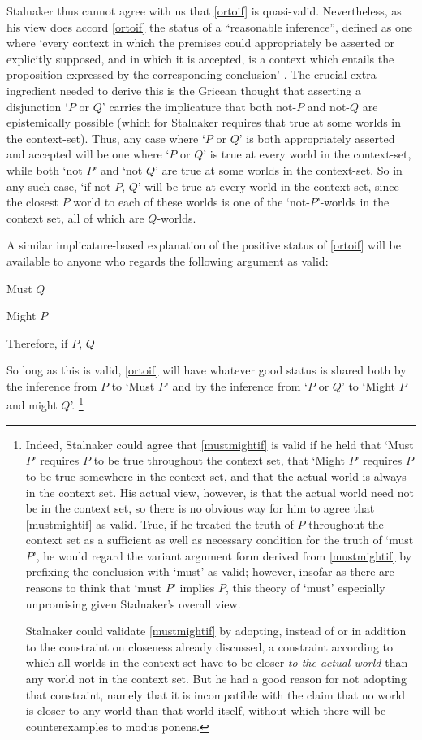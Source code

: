 \documentclass[If.tex]{subfiles}
\begin{document}
Stalnaker thus cannot agree with us that \ref{ortoif} is quasi-valid.  Nevertheless, as his view does accord \ref{ortoif} the status of a “reasonable inference”, defined as one where ‘every context in which the premises could appropriately be asserted or explicitly supposed, and in which it is accepted, is a context which entails the proposition expressed by the corresponding conclusion’ \parencite{StalnakerIC}.  The crucial extra ingredient needed to derive this is the Gricean thought that asserting a disjunction ‘$P$ or $Q$’ carries the implicature that both not-$P$ and not-$Q$ are epistemically possible (which for Stalnaker requires that true at some worlds in the context-set).  Thus, any case where ‘$P$ or $Q$’ is both appropriately asserted and accepted will be one where ‘$P$ or $Q$’ is true at every world in the context-set, while both ‘not $P$’ and ‘not $Q$’ are true at some worlds in the context-set.  So in any such case, ‘if not-$P$, $Q$’ will be true at every world in the context set, since the closest $P$ world to each of these worlds is one of the ‘not-$P$’-worlds in the context set, all of which are $Q$-worlds.  
 
A similar implicature-based explanation of the positive status of \ref{ortoif} will be available to anyone who regards the following argument as valid:
\begin{prop}
	 \label{mustmightif}
	Must $Q$
	
	Might $P$
	
	Therefore, if $P$, $Q$
\end{prop}
So long as this is valid, \ref{ortoif} will have whatever good status is shared both by the inference from $P$ to ‘Must $P$’ and by the inference from ‘$P$ or $Q$’ to ‘Might $P$ and might $Q$’.%
\footnote{Indeed, Stalnaker could agree that \ref{mustmightif} is valid if he held that ‘Must $P$’ requires $P$ to be true throughout the context set, that ‘Might $P$’ requires $P$ to be true somewhere in the context set, and that the actual world is always in the context set.  His actual view, however, is that the actual world need not be in the context set, so there is no obvious way for him to agree that \ref{mustmightif} as valid.  True, if he treated the truth of $P$ throughout the context set as a sufficient as well as necessary condition for the truth of ‘must $P$’, he would regard the variant argument form derived from \ref{mustmightif} by prefixing the conclusion with ‘must’ as valid; however, insofar as there are reasons to think that ‘must $P$’ implies $P$, this theory of ‘must’ especially unpromising given Stalnaker's overall view.
	
	Stalnaker could validate \ref{mustmightif} by adopting, instead of or in addition to the constraint on closeness already discussed, a constraint according to which all worlds in the context set have to be closer \emph{to the actual world} than any world not in the context set.  But he had a good reason for not adopting that constraint, namely that it is incompatible with the claim that no world is closer to any world than that world itself, without which there will be counterexamples to modus ponens.} 
\end{document}
